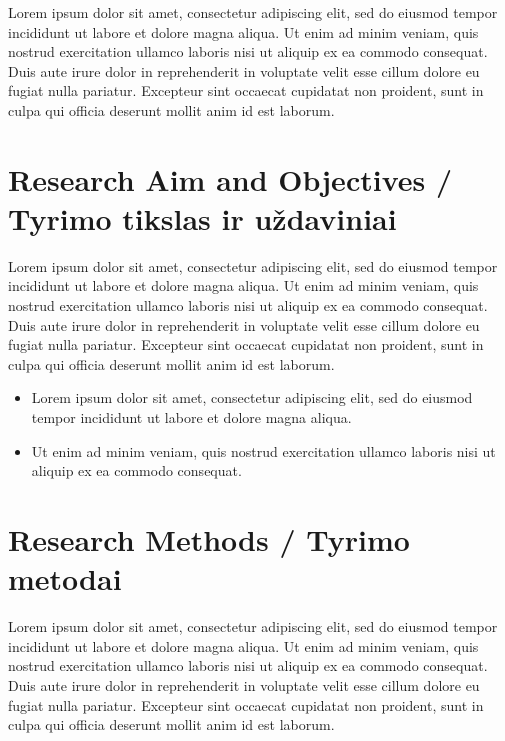 Lorem ipsum dolor sit amet, consectetur adipiscing elit, sed do eiusmod tempor incididunt ut labore et dolore magna aliqua. Ut enim ad minim veniam, quis nostrud exercitation ullamco laboris nisi ut aliquip ex ea commodo consequat. Duis aute irure dolor in reprehenderit in voluptate velit esse cillum dolore eu fugiat nulla pariatur. Excepteur sint occaecat cupidatat non proident, sunt in culpa qui officia deserunt mollit anim id est laborum.



\section*{Research Aim and Objectives / Tyrimo tikslas ir uždaviniai}

Lorem ipsum dolor sit amet, consectetur adipiscing elit, sed do eiusmod tempor incididunt ut labore et dolore magna aliqua. Ut enim ad minim veniam, quis nostrud exercitation ullamco laboris nisi ut aliquip ex ea commodo consequat. Duis aute irure dolor in reprehenderit in voluptate velit esse cillum dolore eu fugiat nulla pariatur. Excepteur sint occaecat cupidatat non proident, sunt in culpa qui officia deserunt mollit anim id est laborum.

\begin{itemize}
    \item Lorem ipsum dolor sit amet, consectetur adipiscing elit, sed do eiusmod tempor incididunt ut labore et dolore magna aliqua. 
    \item  Ut enim ad minim veniam, quis nostrud exercitation ullamco laboris nisi ut aliquip ex ea commodo consequat.
\end{itemize}


\section*{Research Methods / Tyrimo metodai}

Lorem ipsum dolor sit amet, consectetur adipiscing elit, sed do eiusmod tempor incididunt ut labore et dolore magna aliqua. Ut enim ad minim veniam, quis nostrud exercitation ullamco laboris nisi ut aliquip ex ea commodo consequat. Duis aute irure dolor in reprehenderit in voluptate velit esse cillum dolore eu fugiat nulla pariatur. Excepteur sint occaecat cupidatat non proident, sunt in culpa qui officia deserunt mollit anim id est laborum.


